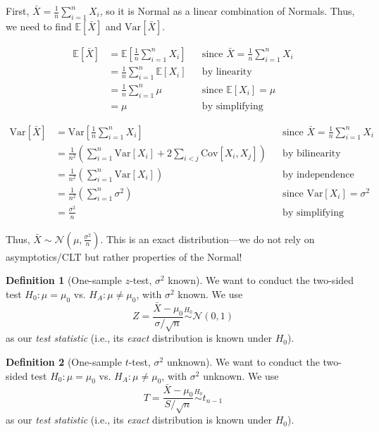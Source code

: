\documentclass[12pt,oneside]{article}
\newcommand{\E}{\mathbb{E}}
\newcommand{\Var}{\text{Var}}
\newcommand{\Cov}{\text{Cov}}
\newcommand{\N}{\mathcal{N}}
\newcommand{\simnull}{\overset{H_0}{\sim}}
\theoremstyle{definition}
\newtheorem{definition}{Definition}
\theoremstyle{remark}
\begin{document}
\begin{solutionbox}
First, $\bar{X} = \frac{1}{n} \sum_{i = 1}^{n} X_{i}$, so it is Normal as a linear combination of Normals. Thus, we need to find $\E[\bar{X}]$ and $\Var[\bar{X}]$.

\[
\begin{aligned}
\E[\bar{X}] &= \E \left[ \frac{1}{n} \sum_{i = 1}^{n} X_{i} \right] && \text{since $\bar{X} = \frac{1}{n} \sum_{i = 1}^{n} X_{i}$} \\
&= \frac{1}{n} \sum_{i = 1}^{n} \E[X_{i}] && \text{by linearity} \\
&= \frac{1}{n} \sum_{i = 1}^{n} \mu && \text{since $\E[X_{i}] = \mu$} \\
&= \mu && \text{by simplifying}
\end{aligned}
\]

\[
\begin{aligned}
\Var[\bar{X}] &= \Var \left[ \frac{1}{n} \sum_{i = 1}^{n} X_{i} \right] && \text{since $\bar{X} = \frac{1}{n} \sum_{i = 1}^{n} X_{i}$} \\
&= \frac{1}{n^2} \left( \sum_{i = 1}^{n} \Var[X_{i}] + 2 \sum_{i < j} \Cov[X_{i}, X_{j}] \right) && \text{by bilinearity} \\
&= \frac{1}{n^2} \left( \sum_{i = 1}^{n} \Var[X_{i}] \right) && \text{by independence} \\
&= \frac{1}{n^2} \left( \sum_{i = 1}^{n} \sigma^2 \right) && \text{since $\Var[X_{i}] = \sigma^2$} \\
&= \frac{\sigma^2}{n} && \text{by simplifying}
\end{aligned}
\]

Thus, $\bar{X} \sim \N \left( \mu, \frac{\sigma^2}{n} \right)$. This is an exact distribution—we do not rely on asymptotics/CLT but rather properties of the Normal!
\end{solutionbox}

\begin{definition}[One-sample $z$-test, $\sigma^2$ known]
We want to conduct the two-sided test $H_{0}: \mu = \mu_{0}$ vs. $H_{A}: \mu \neq \mu_{0}$, with $\sigma^2$ known. We use \[Z = \frac{\bar{X} - \mu_{0}}{\sigma / \sqrt{n}} \simnull \N(0, 1)\] as our \textit{test statistic} (i.e., its \textit{exact} distribution is known under $H_0$).
\end{definition}

\begin{definition}[One-sample $t$-test, $\sigma^2$ unknown]
We want to conduct the two-sided test $H_{0}: \mu = \mu_{0}$ vs. $H_{A}: \mu \neq \mu_{0}$, with $\sigma^2$ unknown. We use \[T = \frac{\bar{X} - \mu_{0}}{S / \sqrt{n}} \simnull t_{n - 1}\] as our \textit{test statistic} (i.e., its \textit{exact} distribution is known under $H_0$).
\end{definition}
\end{document}
